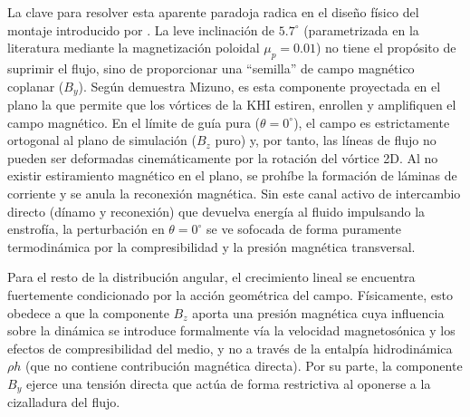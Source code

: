La clave para resolver esta aparente paradoja radica en el diseño físico del montaje introducido por \textcite{mizuno-2013}. La leve inclinación de $5.7^\circ$ (parametrizada en la literatura mediante la magnetización poloidal $\mu_p=0.01$) no tiene el propósito de suprimir el flujo, sino de proporcionar una ``semilla'' de campo magnético coplanar ($B_y$). Según demuestra Mizuno, es esta componente proyectada en el plano la que permite que los vórtices de la KHI estiren, enrollen y amplifiquen el campo magnético. En el límite de guía pura ($\theta=0^\circ$), el campo es estrictamente ortogonal al plano de simulación ($B_z$ puro) y, por tanto, las líneas de flujo no pueden ser deformadas cinemáticamente por la rotación del vórtice 2D. Al no existir estiramiento magnético en el plano, se prohíbe la formación de láminas de corriente y se anula la reconexión magnética. Sin este canal activo de intercambio directo (dínamo y reconexión) que devuelva energía al fluido impulsando la enstrofía, la perturbación en $\theta=0^\circ$ se ve sofocada de forma puramente termodinámica por la compresibilidad y la presión magnética transversal.

Para el resto de la distribución angular, el crecimiento lineal se encuentra fuertemente condicionado por la acción geométrica del campo. Físicamente, esto obedece a que la componente $B_z$ aporta una presión magnética cuya influencia sobre la dinámica se introduce formalmente vía la velocidad magnetosónica y los efectos de compresibilidad del medio, y no a través de la entalpía hidrodinámica $\rho h$ (que no contiene contribución magnética directa). Por su parte, la componente $B_y$ ejerce una tensión directa que actúa de forma restrictiva al oponerse a la cizalladura del flujo.

